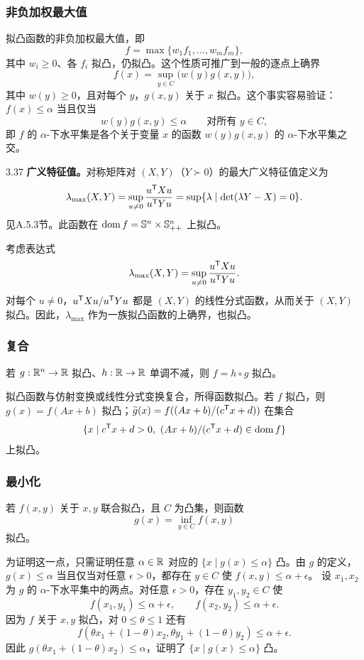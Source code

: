 \subsubsection*{非负加权最大值}
拟凸函数的非负加权最大值，即
\[f=\max\{w_1f_1,\ldots,w_mf_m\},\]
其中 $w_i\geq0$、各 $f_i$ 拟凸，仍拟凸。这个性质可推广到一般的逐点上确界
\[f(x)=\sup_{y\in C}\bigl(w(y)g(x,y)\bigr),\]
其中 $w(y)\geq0$，且对每个 $y$，$g(x,y)$ 关于 $x$ 拟凸。这个事实容易验证：$f(x)\leq\alpha$ 当且仅当
\[w(y)g(x,y)\leq\alpha\qquad\text{对所有 }y\in C,\]
即 $f$ 的 $\alpha$-下水平集是各个关于变量 $x$ 的函数 $w(y)g(x,y)$ 的 $\alpha$-下水平集之交。
\begin{origexample}{3.37}
\textbf{广义特征值。}对称矩阵对 $(X,Y)$（$Y\succ0$）的最大广义特征值定义为
\[\lambda_{\max}(X,Y)=\sup_{u\ne0}\frac{u^\mathsf T Xu}{u^\mathsf T Yu}
 =\sup\{\lambda\mid\det(\lambda Y-X)=0\}.\]
见A.5.3节。此函数在 $\operatorname{dom} f=\mathbb S^n\times\mathbb S_{++}^n$ 上拟凸。

考虑表达式
\[\lambda_{\max}(X,Y)=\sup_{u\ne0}\frac{u^\mathsf T Xu}{u^\mathsf T Yu}.\]
对每个 $u\ne0$，$u^\mathsf T Xu/u^\mathsf T Yu$ 都是 $(X,Y)$ 的线性分式函数，从而关于 $(X,Y)$ 拟凸。因此，$\lambda_{\max}$ 作为一族拟凸函数的上确界，也拟凸。
\end{origexample}
\subsubsection*{复合}
若 $g:\mathbb R^n\to\mathbb R$ 拟凸、$h:\mathbb R\to\mathbb R$ 单调不减，则 $f=h\circ g$ 拟凸。

拟凸函数与仿射变换或线性分式变换复合，所得函数拟凸。若 $f$ 拟凸，则 $g(x)=f(Ax+b)$ 拟凸；$\widetilde g(x)=f((Ax+b)/(c^\mathsf T x+d))$ 在集合
\[\{x\mid c^\mathsf T x+d>0,\ (Ax+b)/(c^\mathsf T x+d)\in\operatorname{dom} f\}\]
上拟凸。
\subsubsection*{最小化}
若 $f(x,y)$ 关于 $x,y$ 联合拟凸，且 $C$ 为凸集，则函数
\[g(x)=\inf_{y\in C}f(x,y)\]
拟凸。

为证明这一点，只需证明任意 $\alpha\in\mathbb R$ 对应的 $\{x\mid g(x)\leq\alpha\}$ 凸。由 $g$ 的定义，$g(x)\leq\alpha$ 当且仅当对任意 $\epsilon>0$，都存在 $y\in C$ 使 $f(x,y)\leq\alpha+\epsilon$。
设 $x_1,x_2$ 为 $g$ 的 $\alpha$-下水平集中的两点。对任意 $\epsilon>0$，存在 $y_1,y_2\in C$ 使
\[f(x_1,y_1)\leq\alpha+\epsilon,\qquad f(x_2,y_2)\leq\alpha+\epsilon.\]
因为 $f$ 关于 $x,y$ 拟凸，对 $0\leq\theta\leq1$ 还有
\[f(\theta x_1+(1-\theta)x_2,\theta y_1+(1-\theta)y_2)\leq\alpha+\epsilon.\]
因此 $g(\theta x_1+(1-\theta)x_2)\leq\alpha$，证明了 $\{x\mid g(x)\leq\alpha\}$ 凸。
